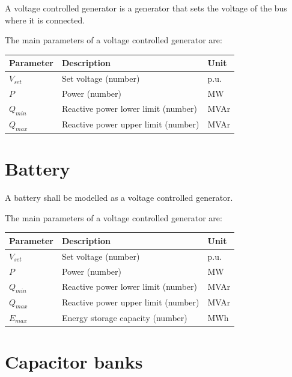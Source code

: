 \documentclass[a4paper,twoside,fleqn]{tufte-book}
\begin{document}
A voltage controlled generator is a generator that sets the voltage of the bus where it is connected.

The main parameters of a voltage controlled generator are:\\
\begin{tabular}{|l|p{5cm}|p{2cm}|}
	\hline 
	Parameter & Description & Unit \\ 
	\hline 
	$V_{set}$ & Set voltage (number) & p.u. \\ 
	\hline 
	$P$ & Power (number) & MW \\ 
	\hline
	$Q_{min}$ & Reactive power lower limit (number) & MVAr \\ 
	\hline
	$Q_{max}$ & Reactive power upper limit (number) & MVAr \\ 
	\hline
\end{tabular} 

\vspace{0.5cm}


\section{Battery}

A battery shall be modelled as a voltage controlled generator.

The main parameters of a voltage controlled generator are:\\
\begin{tabular}{|l|p{5cm}|p{2cm}|}
	\hline 
	Parameter & Description & Unit \\ 
	\hline 
	$V_{set}$ & Set voltage (number) & p.u. \\ 
	\hline 
	$P$ & Power (number) & MW \\ 
	\hline
	$Q_{min}$ & Reactive power lower limit (number) & MVAr \\ 
	\hline
	$Q_{max}$ & Reactive power upper limit (number) & MVAr \\ 
	\hline
	$E_{max}$ & Energy storage capacity (number) & MWh \\ 
	\hline
\end{tabular} 

\vspace{0.5cm}


\section{Capacitor banks}
\end{document}

